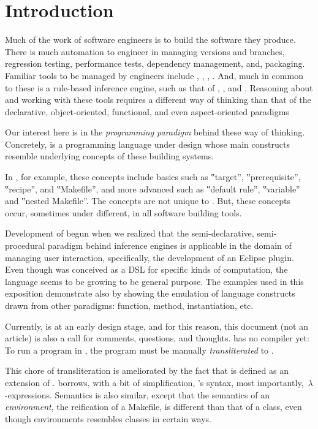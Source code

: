 \section{Introduction}

Much of the work of software engineers is to build the software they produce.
There is much automation to engineer in managing versions and branches,
regression testing, performance tests, dependency management, and, packaging.
Familiar tools to be managed by engineers include
,
,
, . And,
much in common to these is a rule-based inference engine, such as that of
, , and
. Reasoning about and working with these
tools requires a different way of thinking than that of the declarative,
object-oriented, functional, and even aspect-oriented paradigms

Our interest here is in the \emph{programming paradigm} behind these way of
thinking. Concretely, \Reap is a programming language under design whose main
constructs resemble underlying concepts of these building systems.

In , for example, these concepts include basics such as ‟target”,
‟prerequisite”, ‟recipe”, and ‟Makefile”, and more advanced such as ‟default
rule”, ‟variable” and ‟nested Makefile”. The concepts are not unique to
. But, these concepts occur, sometimes under different, in all
software building tools.

Development of \Reap begun when we realized that the semi-declarative,
semi-procedural paradigm behind inference engines is applicable in the domain
of managing user interaction, specifically, the development of an Eclipse
plugin. Even though \Reap was conceived as a DSL for specific kinds of
computation, the language seems to be growing to be general purpose. The
examples used in this exposition demonstrate \Reap also by showing the
emulation of language constructs drawn from other paradigms: function, method,
instantiation, etc.

Currently, \Reap is at an early design stage, and for this reason, this
document (not an article) is also a call for comments, questions, and thoughts.
\Reap has no compiler yet: To run a program in \Reap, the program must be
manually \emph{transliterated} to \Java.

This chore of transliteration is ameliorated by the fact that \Reap is defined
as an extension of \Java. \Reap borrows, with a bit of simplification, \Java's
syntax, most importantly,~$λ$-expressions. Semantics is also similar, except
that the semantics of an \emph{environment}, the \Reap reification of a
Makefile, is different than that of a \Java class, even though environments
resembles classes in certain ways.

